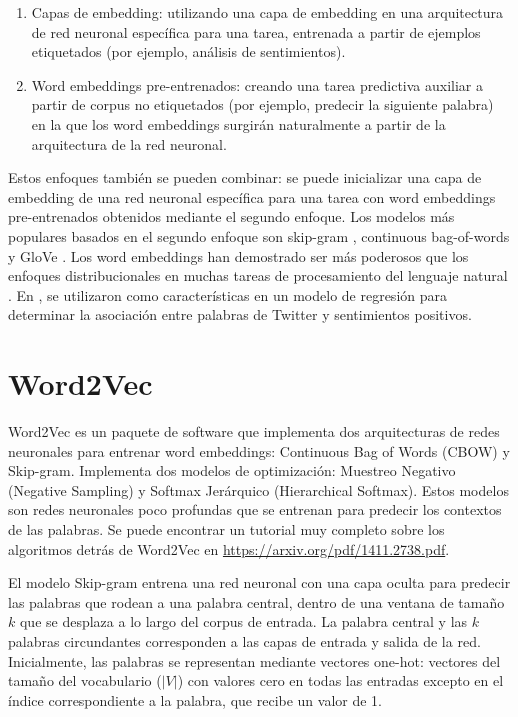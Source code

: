 \begin{enumerate}
 \item Capas de embedding: utilizando una capa de embedding en una arquitectura de red neuronal específica para una tarea, entrenada a partir de ejemplos etiquetados (por ejemplo, análisis de sentimientos).
\item Word embeddings pre-entrenados: creando una tarea predictiva auxiliar a partir de corpus no etiquetados (por ejemplo, predecir la siguiente palabra) en la que los word embeddings surgirán naturalmente a partir de la arquitectura de la red neuronal.
\end{enumerate}



Estos enfoques también se pueden combinar: se puede inicializar una capa de embedding de una red neuronal específica para una tarea con word embeddings pre-entrenados obtenidos mediante el segundo enfoque.
Los modelos más populares basados en el segundo enfoque son skip-gram \cite{Mikolov2013}, continuous bag-of-words \cite{Mikolov2013} y GloVe \cite{penningtonSM14}.
Los word embeddings han demostrado ser más poderosos que los enfoques distribucionales en muchas tareas de procesamiento del lenguaje natural \cite{baroni2014don}.
En \cite{amir2015SemEval}, se utilizaron como características en un modelo de regresión para determinar la asociación entre palabras de Twitter y sentimientos positivos.


\section{Word2Vec}
Word2Vec es un paquete de software que implementa dos arquitecturas de redes neuronales para entrenar word embeddings: Continuous Bag of Words (CBOW) y Skip-gram.
Implementa dos modelos de optimización: Muestreo Negativo (Negative Sampling) y Softmax Jerárquico (Hierarchical Softmax).
Estos modelos son redes neuronales poco profundas que se entrenan para predecir los contextos de las palabras.
Se puede encontrar un tutorial muy completo sobre los algoritmos detrás de Word2Vec en \url{https://arxiv.org/pdf/1411.2738.pdf}.

El modelo Skip-gram entrena una red neuronal con una capa oculta para predecir las palabras que rodean a una palabra central, dentro de una ventana de tamaño $k$ que se desplaza a lo largo del corpus de entrada.
La palabra central y las $k$ palabras circundantes corresponden a las capas de entrada y salida de la red.
Inicialmente, las palabras se representan mediante vectores one-hot: vectores del tamaño del vocabulario ($|V|$) con valores cero en todas las entradas excepto en el índice correspondiente a la palabra, que recibe un valor de 1.


